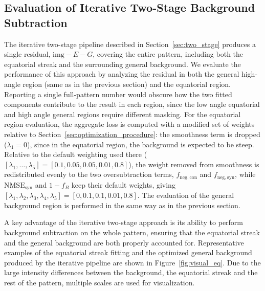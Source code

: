 \documentclass[iucr]{iucrjournals}
\begin{document}


\subsection{Evaluation of Iterative Two-Stage Background Subtraction}
\label{sec:two_stage_eval}

The iterative two-stage pipeline described in Section~\ref{sec:two_stage} produces a single residual, $\mathrm{img} - E - G$, covering the entire pattern, including both the equatorial streak and the surrounding general background. We evaluate the performance of this approach by analyzing the residual in both the general high-angle region (same as in the previous section) and the equatorial region. Reporting a single full-pattern number would obscure how the two fitted components contribute to the result in each region, since the low angle equatorial and high angle general regions require different masking. For the equatorial region evaluation, the aggregate loss is computed with a modified set of weights relative to Section~\ref{sec:optimization_procedure}: the smoothness term is dropped ($\lambda_1 = 0$), since in the equatorial region, the background is expected to be steep. Relative to the default weighting used there ($[\lambda_1,\ldots,\lambda_5] = [0.1, 0.05, 0.05, 0.01, 0.8]$), the weight removed from smoothness is redistributed evenly to the two oversubtraction terms, $f_{\mathrm{neg,con}}$ and $f_{\mathrm{neg,syn}}$, while $\mathrm{NMSE}_{\mathrm{syn}}$ and $1-f_B$ keep their default weights, giving $[\lambda_1, \lambda_2, \lambda_3, \lambda_4, \lambda_5] = [0, 0.1, 0.1, 0.01, 0.8]$. The evaluation of the general background region is performed in the same way as in the previous section.

A key advantage of the iterative two-stage approach is its ability to perform background subtraction on the whole pattern, ensuring that the equatorial streak and the general background are both properly accounted for. Representative examples of the equatorial streak fitting and the optimized general background produced by the iterative pipeline are shown in Figure~\ref{fig:visual_eq}. Due to the large intensity differences between the background, the equatorial streak and the rest of the pattern, multiple scales are used for visualization. 
\end{document}
